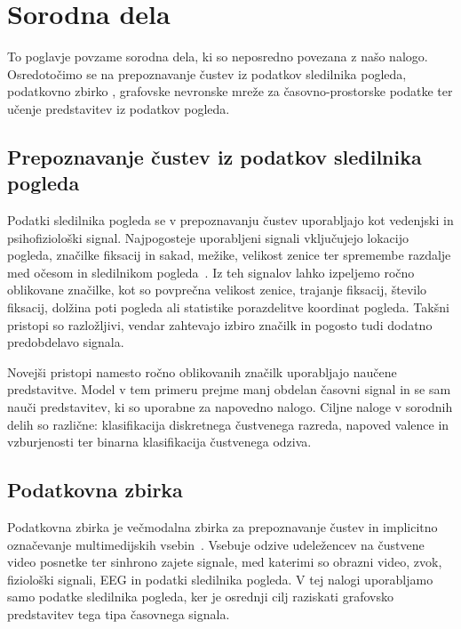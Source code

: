 \chapter{Sorodna dela}
\label{sec:sorodna-dela}

To poglavje povzame sorodna dela, ki so neposredno povezana z našo nalogo.
Osredotočimo se na prepoznavanje čustev iz podatkov sledilnika pogleda, podatkovno zbirko \MAHNOB{}, grafovske nevronske mreže za časovno-prostorske podatke ter učenje predstavitev iz podatkov pogleda.

\section{Prepoznavanje čustev iz podatkov sledilnika pogleda}
\label{subsec:sorodna-et-emotion}

Podatki sledilnika pogleda se v prepoznavanju čustev uporabljajo kot vedenjski in psihofiziološki signal.
Najpogosteje uporabljeni signali vključujejo lokacijo pogleda, značilke fiksacij in sakad, mežike, velikost zenice ter spremembe razdalje med očesom in sledilnikom pogleda~\cite{lim2020emotion,tarnowski2020eye}.
Iz teh signalov lahko izpeljemo ročno oblikovane značilke, kot so povprečna velikost zenice, trajanje fiksacij, število fiksacij, dolžina poti pogleda ali statistike porazdelitve koordinat pogleda.
Takšni pristopi so razložljivi, vendar zahtevajo izbiro značilk in pogosto tudi dodatno predobdelavo signala.

Novejši pristopi namesto ročno oblikovanih značilk uporabljajo naučene predstavitve.
Model v tem primeru prejme manj obdelan časovni signal in se sam nauči predstavitev, ki so uporabne za napovedno nalogo.
Ciljne naloge v sorodnih delih so različne: klasifikacija diskretnega čustvenega razreda, napoved valence in vzburjenosti ter binarna klasifikacija čustvenega odziva.

\section{Podatkovna zbirka \MAHNOB{}}
\label{subsec:sorodna-mahnob}

Podatkovna zbirka \MAHNOB{} je večmodalna zbirka za prepoznavanje čustev in implicitno označevanje multimedijskih vsebin~\cite{soleymani2012mahnob}.
Vsebuje odzive udeležencev na čustvene video posnetke ter sinhrono zajete signale, med katerimi so obrazni video, zvok, fiziološki signali, EEG in podatki sledilnika pogleda.
V tej nalogi uporabljamo samo podatke sledilnika pogleda, ker je osrednji cilj raziskati grafovsko predstavitev tega tipa časovnega signala.

